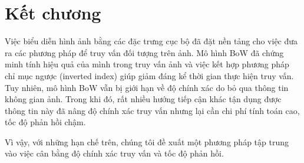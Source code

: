 \section{Kết chương}

Việc biểu diễn hình ảnh bằng các đặc trưng cục bộ đã đặt nền tảng cho việc đưa ra các phương pháp để truy vấn đối tượng trên ảnh. Mô hình BoW đã chứng minh tính hiệu quả của mình trong truy vấn ảnh và việc kết hợp phương pháp chỉ mục ngược (inverted index) giúp giảm đáng kể thời gian thực hiện truy vấn. Tuy nhiên, mô hình BoW vẫn bị giới hạn về độ chính xác do bỏ qua thông tin không gian ảnh. Trong khi đó, rất nhiều hướng tiếp cận khác tận dụng được thông tin này đã nâng độ chính xác truy vấn nhưng lại cần chi phí tính toán cao, tốc độ phản hồi chậm.

Vì vậy, với những hạn chế trên, chúng tôi đề xuất một phương pháp tập trung vào việc cân bằng độ chính xác truy vấn và tốc độ phản hồi. 